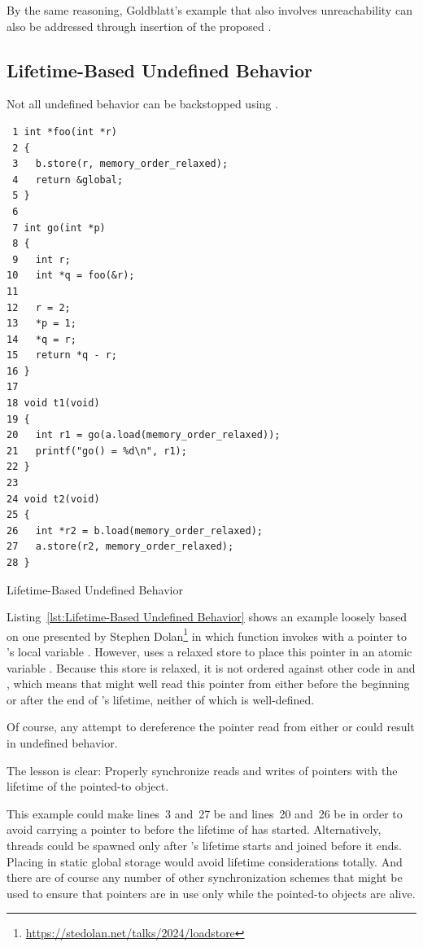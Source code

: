 \documentclass[10]{article}
\begin{document}
By the same reasoning, Goldblatt's  example that
also involves unreachability can also be addressed through insertion
of the proposed .

\subsection{Lifetime-Based Undefined Behavior}
\label{sec:Lifetime-Based Undefined Behavior}

Not all undefined behavior can be backstopped using
.

\begin{listing}[tbp]
\begin{verbatim}
 1 int *foo(int *r)
 2 {
 3   b.store(r, memory_order_relaxed);
 4   return &global;
 5 }
 6
 7 int go(int *p)
 8 {
 9   int r;
10   int *q = foo(&r);
11
12   r = 2;
13   *p = 1;
14   *q = r;
15   return *q - r;
16 }
17
18 void t1(void)
19 {
20   int r1 = go(a.load(memory_order_relaxed));
21   printf("go() = %d\n", r1);
22 }
23
24 void t2(void)
25 {
26   int *r2 = b.load(memory_order_relaxed);
27   a.store(r2, memory_order_relaxed);
28 }
\end{verbatim}
\caption{Lifetime-Based Undefined Behavior}
\label{lst:Lifetime-Based Undefined Behavior}
\end{listing}

Listing~\ref{lst:Lifetime-Based Undefined Behavior}
shows an example loosely based on one presented by Stephen Dolan\footnote{
	\url{https://stedolan.net/talks/2024/loadstore}}
in which function  invokes  with a pointer to 's
local variable .
However,  uses a relaxed store to place this pointer in
an atomic variable .
Because this store is relaxed, it is not ordered against other code
in  and , which means that  might well
read this pointer from  either before the beginning or after
the end of 's lifetime, neither of which is well-defined.

Of course, any attempt to dereference the pointer read from either
 or  could result in undefined behavior.

The lesson is clear:
Properly synchronize reads and writes of pointers with the lifetime
of the pointed-to object.

This example could make lines~3 and~27 be  and
lines~20 and~26 be  in order to avoid carrying
a pointer to  before the lifetime of  has started.
Alternatively, threads could be spawned only after 's lifetime
starts and joined before it ends.
Placing  in static global storage would avoid lifetime considerations
totally.
And there are of course any number of other synchronization schemes
that might be used to ensure that pointers are in use only while the
pointed-to objects are alive.
\end{document}
